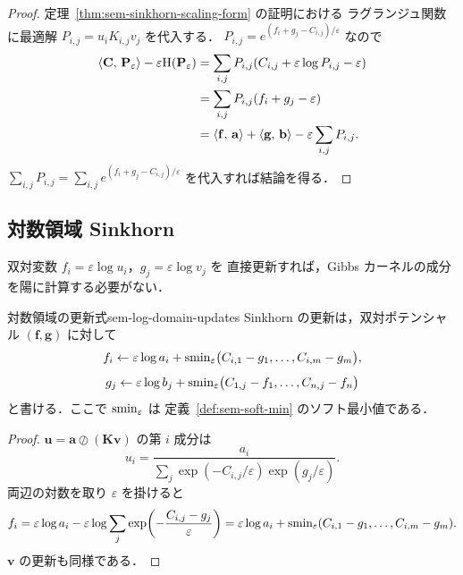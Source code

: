 \begin{proof}
  定理~\ref{thm:sem-sinkhorn-scaling-form} の証明における
  ラグランジュ関数に最適解 $P_{i,j} = u_i K_{i,j} v_j$ を代入する．
  $P_{i,j} = e^{(f_i + g_j - C_{i,j})/\varepsilon}$ なので
  \begin{align*}
    \langle \mathbf{C},\, \mathbf{P}_\varepsilon \rangle
    - \varepsilon\mathrm{H}(\mathbf{P}_\varepsilon)
    &= \sum_{i,j} P_{i,j}(C_{i,j} + \varepsilon\log P_{i,j} - \varepsilon) \\
    &= \sum_{i,j} P_{i,j}(f_i + g_j - \varepsilon) \\
    &= \langle \mathbf{f},\, \mathbf{a} \rangle + \langle \mathbf{g},\, \mathbf{b} \rangle
       - \varepsilon \sum_{i,j} P_{i,j}.
  \end{align*}
  $\sum_{i,j} P_{i,j} = \sum_{i,j} e^{(f_i + g_j - C_{i,j})/\varepsilon}$
  を代入すれば結論を得る．
\end{proof}

\subsection{対数領域 Sinkhorn}

双対変数 $f_i = \varepsilon \log u_i$，$g_j = \varepsilon \log v_j$ を
直接更新すれば，Gibbs カーネルの成分を陽に計算する必要がない．

\begin{proposition}{対数領域の更新式}{sem-log-domain-updates}
  Sinkhorn の更新は，双対ポテンシャル $(\mathbf{f},\mathbf{g})$ に対して
  \[
    f_i
    \leftarrow
    \varepsilon\log a_i
    +
    \operatorname{smin}_\varepsilon
    \bigl(C_{i,1}-g_1,\ldots,C_{i,m}-g_m\bigr),
  \]
  \[
    g_j
    \leftarrow
    \varepsilon\log b_j
    +
    \operatorname{smin}_\varepsilon
    \bigl(C_{1,j}-f_1,\ldots,C_{n,j}-f_n\bigr)
  \]
  と書ける．ここで $\operatorname{smin}_\varepsilon$ は
  定義~\ref{def:sem-soft-min} のソフト最小値である．
\end{proposition}

\begin{proof}
  $\mathbf{u} = \mathbf{a}\oslash(\mathbf{K}\mathbf{v})$ の第 $i$ 成分は
  \[
    u_i
    =
    \frac{a_i}{\sum_j \exp(-C_{i,j}/\varepsilon)\exp(g_j/\varepsilon)}.
  \]
  両辺の対数を取り $\varepsilon$ を掛けると
  \[
    f_i
    =
    \varepsilon\log a_i
    -
    \varepsilon\log
    \sum_j \exp\!\left(-\frac{C_{i,j}-g_j}{\varepsilon}\right)
    =
    \varepsilon\log a_i
    +
    \operatorname{smin}_\varepsilon(C_{i,1}-g_1,\ldots,C_{i,m}-g_m).
  \]
  $\mathbf{v}$ の更新も同様である．
\end{proof}

